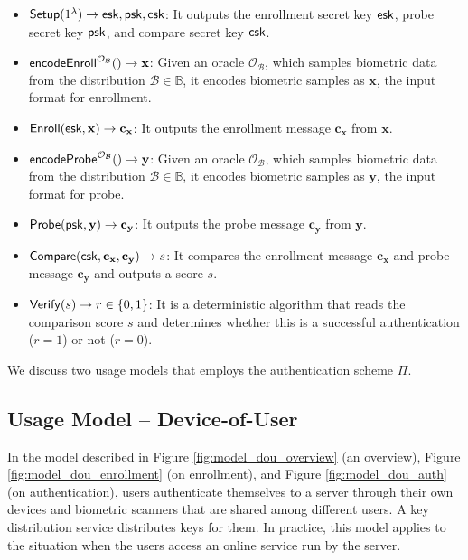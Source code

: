 \begin{itemize}

	\item ${\sf Setup}(1^\lambda) \to {\sf esk}, {\sf psk}, {\sf csk}$: It outputs the enrollment secret key ${\sf esk}$, probe secret key ${\sf psk}$, and compare secret key $\sf csk$.

	\item ${\sf encodeEnroll}^{\mathcal{O}_{\mathcal{B}}}() \to \mathbf{x}$: Given an oracle $\mathcal{O}_{\mathcal{B}}$, which samples biometric data from the distribution $\mathcal{B} \in \mathbb{B}$, it encodes biometric samples as $\mathbf{x}$, the input format for enrollment. 

	\item ${\sf Enroll}({\sf esk}, \mathbf{x}) \to \mathbf{c_x}$: It outputs the enrollment message $\mathbf{c_x}$ from $\mathbf{x}$.

	\item ${\sf encodeProbe}^{\mathcal{O}_{\mathcal{B}}}() \to \mathbf{y}$: Given an oracle $\mathcal{O}_{\mathcal{B}}$, which samples biometric data from the distribution $\mathcal{B} \in \mathbb{B}$, it encodes biometric samples as $\mathbf{y}$, the input format for probe.

	\item ${\sf Probe}({\sf psk}, \mathbf{y}) \to \mathbf{c_y}$: It outputs the probe message $\mathbf{c_y}$ from $\mathbf{y}$.

	\item ${\sf Compare}({\sf csk}, \mathbf{c_x}, \mathbf{c_y)} \to s$: It compares the enrollment message $\mathbf{c_x}$ and probe message $\mathbf{c_y}$ and outputs a score $s$.

	\item ${\sf Verify}(s) \to r \in \{0,1\}$: It is a deterministic algorithm that reads the comparison score $s$ and determines whether this is a successful authentication ($r = 1$) or not ($r = 0$).

\end{itemize}

\noindent 
We discuss two usage models that employs the authentication scheme $\Pi$.


\subsection{Usage Model – Device-of-User}
\label{sec:dou_model}

In the model described in Figure \ref{fig:model_dou_overview} (an overview), Figure \ref{fig:model_dou_enrollment} (on enrollment), and Figure \ref{fig:model_dou_auth} (on authentication), users authenticate themselves to a server through their own devices and biometric scanners that are shared among different users.
A key distribution service distributes keys for them. In practice, this model applies to the situation when the users access an online service run by the server.

